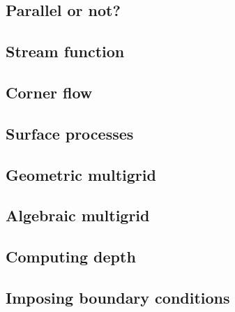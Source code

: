 \subsection{Parallel or not?} \label{sec:parallel}  %
\newpage %
\subsection{Stream function} \label{sec:streamfunction}  %
\newpage %
\subsection{Corner flow} \label{sec:cornerflow}  %
\newpage %
\subsection{Surface processes \label{sec:surfaceprocesses}}  %
\newpage %
\subsection{Geometric multigrid}  %
\newpage %
\subsection{Algebraic multigrid}  %
\newpage %
\subsection{Computing depth \label{ss:depth}}  %
\newpage %
\subsection{Imposing boundary conditions \label{ss:howtobc}}  %
\newpage %
